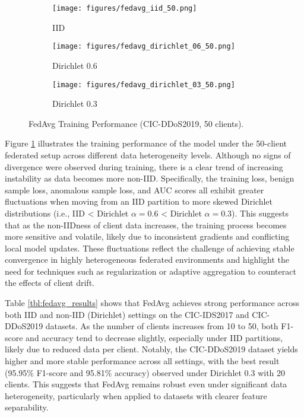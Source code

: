 \begin{figure}[h]
    \centering

    \begin{subfigure}[b]{0.32\textwidth}
        \centering
        \texttt{[image: figures/fedavg\_iid\_50.png]}
        \caption{IID}
    \end{subfigure}
    \hfill
    \begin{subfigure}[b]{0.32\textwidth}
        \centering
        \texttt{[image: figures/fedavg\_dirichlet\_06\_50.png]}
        \caption{Dirichlet 0.6}
    \end{subfigure}
    \hfill
    \begin{subfigure}[b]{0.32\textwidth}
        \centering
        \texttt{[image: figures/fedavg\_dirichlet\_03\_50.png]}
        \caption{Dirichlet 0.3}
    \end{subfigure}

    \caption{FedAvg Training Performance (CIC-DDoS2019, 50 clients).}
    \label{fig:fedavg_performance}
\end{figure}

Figure \ref{fig:fedavg_performance} illustrates the training performance of the model under the 50-client federated setup across different data heterogeneity levels. Although no signs of divergence were observed during training, there is a clear trend of increasing instability as data becomes more non-IID. Specifically, the training loss, benign sample loss, anomalous sample loss, and AUC scores all exhibit greater fluctuations when moving from an IID partition to more skewed Dirichlet distributions (i.e., IID < Dirichlet $\alpha=0.6$ < Dirichlet $\alpha=0.3$). This suggests that as the non-IIDness of client data increases, the training process becomes more sensitive and volatile, likely due to inconsistent gradients and conflicting local model updates. These fluctuations reflect the challenge of achieving stable convergence in highly heterogeneous federated environments and highlight the need for techniques such as regularization or adaptive aggregation to counteract the effects of client drift.

Table \ref{tbl:fedavg_results} shows that FedAvg achieves strong performance across both IID and non-IID (Dirichlet) settings on the CIC-IDS2017 and CIC-DDoS2019 datasets. As the number of clients increases from 10 to 50, both F1-score and accuracy tend to decrease slightly, especially under IID partitions, likely due to reduced data per client. Notably, the CIC-DDoS2019 dataset yields higher and more stable performance across all settings, with the best result (95.95\% F1-score and 95.81\% accuracy) observed under Dirichlet 0.3 with 20 clients. This suggests that FedAvg remains robust even under significant data heterogeneity, particularly when applied to datasets with clearer feature separability.

